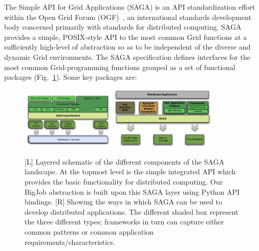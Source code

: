 \documentclass{rspublic}
\begin{document}
The Simple API for Grid Applications (SAGA) is an API
standardization effort within the Open Grid Forum
(OGF)~\cite{saga_gfd90}, an international standards development body
concerned primarily with standards for distributed computing. SAGA
provides a simple, POSIX-style API to the most common Grid functions
at a sufficiently high-level of abstraction so as to be independent of
the diverse and dynamic Grid environments. The SAGA specification
defines interfaces for the most common Grid-programming functions
grouped as a set of functional packages (Fig.~\ref{Fig:SAGA1}). Some
key packages are:

\begin{figure}[!ht]
 \begin{center}
     \includegraphics[width=0.40\textwidth]{stci_saga_figures-1.pdf}
    \includegraphics[width=0.45\textwidth]{distributed_applications_saga_figure.pdf}
\end{center}
\caption{\small [L] Layered schematic of the different components of
  the SAGA landscape. At the topmost level is the simple integrated
  API which provides the basic functionality for distributed
  computing. Our BigJob abstraction is built upon this SAGA layer
  using Python API bindings. [R] Showing the ways in which SAGA can be
  used to develop distributed applications.  The different shaded box
  represent the three different types; frameworks in turn can capture
  either common patterns or common application
  requirements/characteristics.} \label{Fig:SAGA1}
\end{figure}
\end{document}
